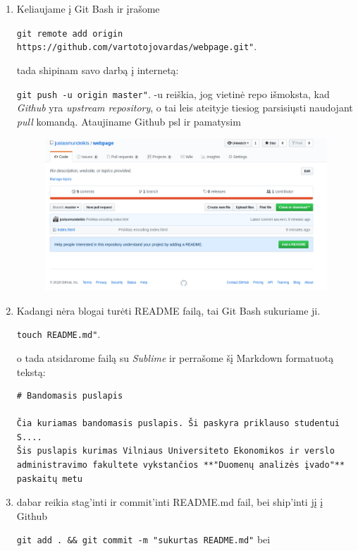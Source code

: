 \documentclass[12pt,a4paper]{article}
\begin{document}
\begin{enumerate}
\item Keliaujame į Git Bash ir įrašome

\colorbox{listinggray}{\lstinline|git remote add origin https://github.com/vartotojovardas/webpage.git"|}.

tada shipinam savo darbą į internetą:

\colorbox{listinggray}{\lstinline|git push -u origin master"|}. -u reiškia, jog vietinė repo išmoksta, kad \textit{Github} yra \textit{upstream repository}, o tai leis ateityje tiesiog parsisiųsti naudojant \textit{pull} komandą. Ataujiname Github psl ir pamatysim

\begin{figure}[H]
\center
\includegraphics[scale=0.4]{webpage_7.png}
\end{figure}

\item Kadangi nėra blogai turėti README failą, tai Git Bash sukuriame ji.

\colorbox{listinggray}{\lstinline|touch README.md"|}.

o tada atsidarome failą su \textit{Sublime} ir perrašome šį Markdown formatuotą tekstą:

\begin{lstlisting}
# Bandomasis puslapis

Čia kuriamas bandomasis puslapis. Ši paskyra priklauso studentui S.... 
Šis puslapis kurimas Vilniaus Universiteto Ekonomikos ir verslo administravimo fakultete vykstančios **"Duomenų analizės įvado"** paskaitų metu
\end{lstlisting}

\item dabar reikia stag'inti ir commit'inti  README.md fail, bei ship'inti jį į Github


\colorbox{listinggray}{\lstinline|git add . && git commit -m "sukurtas README.md"|} bei


\end{enumerate}
\end{document}
